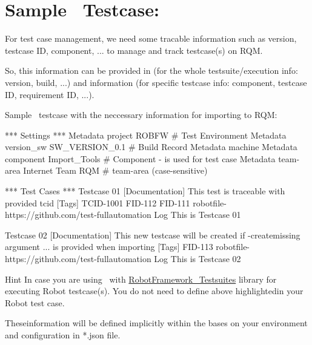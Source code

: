 %
%

\hypertarget{description-sample-robotframework-testcase}{%
\section{Sample \rfwcore\ Testcase:}
\label{description-sample-robotframework-testcase}}

For test case management, we need some tracable information such as
version, testcase ID, component, ... to manage and track testcase(s) on
RQM.

So, this information can be provided in  (for the whole
testsuite/execution info: version, build, ...) and \rcode{{[}Tags{]}}
information (for specific testcase info: component, testcase ID,
requirement ID, ...).

Sample \rfwcore\ testcase with the neccessary information for importing to
RQM:

\begin{robotcode}[caption=Sample \rfwcore\ testcase,
                  linebackgroundcolor=\hlcode{2,3,4}]
*** Settings ***
Metadata   project      ROBFW             # Test Environment
Metadata   version_sw   SW_VERSION_0.1    # Build Record
Metadata   machine      %
Metadata   component    Import_Tools      # Component - is used for test case
Metadata   team-area    Internet Team RQM  # team-area (case-sensitive)

*** Test Cases ***
Testcase 01
   [Documentation]   This test is traceable with provided tcid
   [Tags]   TCID-1001   FID-112   FID-111    robotfile-https://github.com/test-fullautomation
   Log      This is Testcase 01

Testcase 02
   [Documentation]  This new testcase will be created if -createmissing argument
               ...  is provided when importing
   [Tags]   FID-113  robotfile-https://github.com/test-fullautomation
   Log      This is Testcase 02
\end{robotcode}

\begin{boxhint} {Hint}
  In case you are using \rfw\ with 
  \href{https://github.com/test-fullautomation/robotframework-testsuitesmanagement}{RobotFramework\_Testsuites}
  library for executing Robot testcase(s). 
  You do not need to define above highlightedin your Robot test case.

  Theseinformation will be defined implicitly within the 
   bases on your environment and configuration in *.json file.
\end{boxhint}

